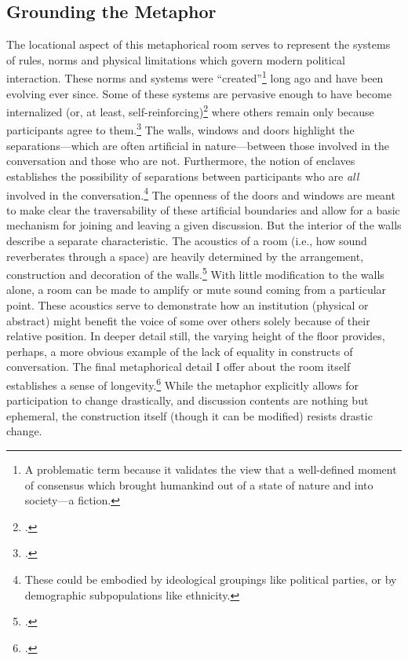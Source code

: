 \documentclass[openany,twoside]{memoir}
\begin{document}
\begin{Spacing}{2}
\subsection{Grounding the Metaphor}
The locational aspect of this metaphorical room serves to represent the systems of rules, norms and physical limitations which govern modern political interaction.
These norms and systems were ``created''\footnote{
A problematic term because it validates the view that a well-defined moment of consensus which brought humankind out of a state of nature and into society---a fiction.} 
long ago and have been evolving ever since.
Some of these systems are pervasive enough to have become internalized (or, at least, self-reinforcing)\footcite[Like mobilizing bias in][]{schattschneider75} where others remain only because participants agree to them.\footcite[Reminiscent of pre-cursory agreements discussed by][]{bickford96}
The walls, windows and doors highlight the separations---which are often artificial in nature---between those involved in the conversation and those who are not.
Furthermore, the notion of enclaves establishes the possibility of separations between participants who are \emph{all} involved in the conversation.\footnote{
These could be embodied by ideological groupings like political parties, or by demographic subpopulations like ethnicity.}
The openness of the doors and windows are meant to make clear the traversability of these artificial boundaries and allow for a basic mechanism for joining and leaving a given discussion.
But the interior of the walls describe a separate characteristic.
The acoustics of a room (i.e., how sound reverberates through a space) are heavily determined by the arrangement, construction and decoration of the walls.\footcite{giddens86}
With little modification to the walls alone, a room can be made to amplify or mute sound coming from a particular point.
These acoustics serve to demonstrate how an institution (physical or abstract) might benefit the voice of some over others solely because of their relative position.
In deeper detail still, the varying height of the floor provides, perhaps, a more obvious example of the lack of equality in constructs of conversation.
The final metaphorical detail I offer about the room itself establishes a sense of longevity.\footcite{mintzberg85,giddens86}
While the metaphor explicitly allows for participation to change drastically, and discussion contents are nothing but ephemeral, the construction itself (though it can be modified) resists drastic change.


\end{Spacing}
\end{document}
